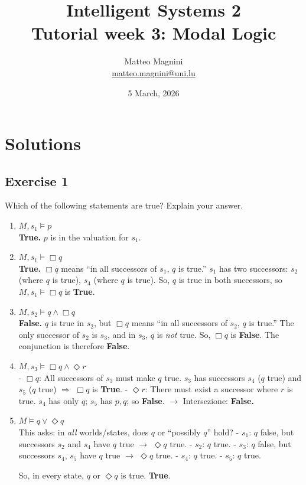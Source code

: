 \documentclass[11pt]{article}
\title{
    Intelligent Systems 2\\
    Tutorial week 3: Modal Logic
}
\author{
    Matteo Magnini\\
    \href{mailto:matteo.magnini@uni.lu}{matteo.magnini@uni.lu}
}
\date{
    5 March, 2026
}
\begin{document}
    \maketitle

    \section{Solutions}

    \subsection{Exercise 1}

    Which of the following statements are true?
    Explain your answer.
    \begin{enumerate}
        \item[(a)] $M, s_1 \models p$\\
        \textbf{True.} $p$ is in the valuation for $s_1$.

        \item[(b)] $M, s_1 \models \Box q$\\
        \textbf{True.} $\Box q$ means ``in all successors of $s_1$, $q$ is true.''
        $s_1$ has two successors: $s_2$ (where $q$ is true), $s_4$ (where $q$ is true).
        So, $q$ is true in both successors, so $M, s_1 \models \Box q$ is \textbf{True}.

        \item[(c)] $M, s_2 \models q \wedge \Box q$\\
        \textbf{False.} $q$ is true in $s_2$, but $\Box q$ means ``in all successors of $s_2$, $q$ is true.''
        The only successor of $s_2$ is $s_3$, and in $s_3$, $q$ is \emph{not} true.
        So, $\Box q$ is \textbf{False}. The conjunction is therefore \textbf{False}.

        \item[(d)] $M, s_3 \models \Box q \wedge \Diamond r$\\
        - $\Box q$: All successors of $s_3$ must make $q$ true. $s_3$ has successors $s_4$ ($q$ true) and $s_5$ ($q$ true) $\Rightarrow$ $\Box q$ is \textbf{True}.
        - $\Diamond r$: There must exist a successor where $r$ is true. $s_4$ has only $q$; $s_5$ has $p,q$; so \textbf{False}.
        $\rightarrow$ Intersezione: \textbf{False.}

        \item[(e)] $M \models q \lor \Diamond q$\\
        This asks: in \emph{all} worlds/states, does $q$ or ``possibly $q$'' hold?
        - $s_1$: $q$ false, but successors $s_2$ and $s_4$ have $q$ true $\rightarrow$ $\Diamond q$ true.
        - $s_2$: $q$ true.
        - $s_3$: $q$ false, but successors $s_4$, $s_5$ have $q$ true $\rightarrow$ $\Diamond q$ true.
        - $s_4$: $q$ true.
        - $s_5$: $q$ true.

        So, in every state, $q$ or $\Diamond q$ is true. \textbf{True}.
    \end{enumerate}
\end{document}
